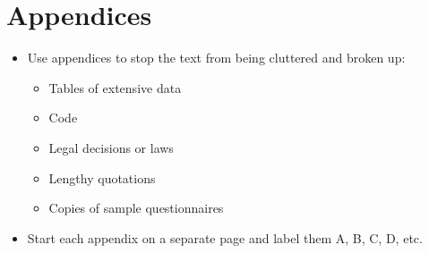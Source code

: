 \section{Appendices}
\begin{itemize}
\item Use appendices to stop the text from being cluttered and broken up:
\begin{itemize}
\item Tables of extensive data
\item Code
\item Legal decisions or laws
\item Lengthy quotations
\item Copies of sample questionnaires
\end{itemize}
\item Start each appendix on a separate page and label them A, B, C, D, etc.
\end{itemize}